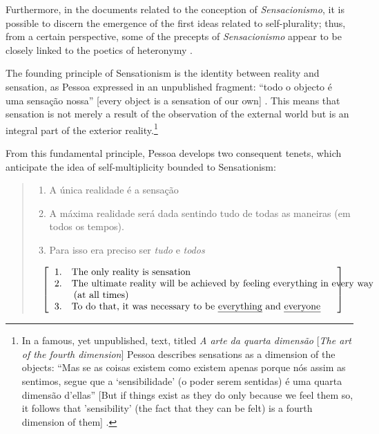 \begin{paper}
Furthermore, in the documents related to the conception of
\emph{Sensacionismo}, it is possible to discern the emergence of the
first ideas related to self-plurality; thus, from a certain perspective,
some of the precepts of \emph{Sensacionismo} appear to be closely linked
to the poetics of heteronymy \parencite[9]{pessoa_sobre_2015}.

The founding principle of Sensationism is the identity between reality
and sensation, as Pessoa expressed in an unpublished fragment: ``todo o
objecto é uma sensação nossa'' [every object is a sensation of our
own] \parencite[145]{pessoa_sensacionismo_2009}. This means that sensation is not merely a
result of the observation of the external world but is an integral part
of the exterior reality.\footnote{In a famous, yet unpublished, text,
  titled \emph{A arte da quarta dimensão} [\emph{The art of the fourth
  dimension}] Pessoa describes sensations as a dimension of the
  objects: ``Mas se as coisas existem como existem apenas porque nós
  assim as sentimos, segue que a `sensibilidade' (o poder serem
  sentidas) é uma quarta dimensão d'ellas'' [But if things exist as
  they do only because we feel them so, it follows that 'sensibility'
  (the fact that they can be felt) is a fourth dimension of them]
  \parencite[148--149]{pessoa_sensacionismo_2009}.}

From this fundamental principle, Pessoa develops two consequent tenets,
which anticipate the idea of self-multiplicity bounded to Sensationism:

\begin{quote}
 \begin{enumerate}
\def\labelenumi{\arabic{enumi}.}
\item
  A única realidade é a sensação
\item
  A máxima realidade será dada sentindo tudo de todas as maneiras (em
  todos os tempos).
\item
  Para isso era preciso ser \emph{tudo} e \emph{todos}
\end{enumerate}

\begin{center}
\begin{equation*}
 \left[\begin{tabular}{p{.835\textwidth}}
    \text{1.\quad The only reality is sensation}\\
    \text{2.\quad The ultimate reality will be achieved by feeling everything in every way} \\
    \text{\qquad (at all times)}\\
    \text{3.\quad To do that, it was necessary to be \emph{everything} and \emph{everyone}}\\
    \end{tabular}\right]
\end{equation*}
\end{center}


\end{quote}
\end{paper}
